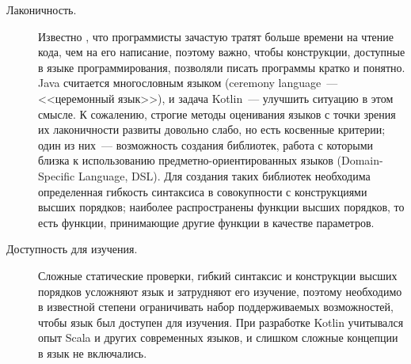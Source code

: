 \begin{description}
	\item[Лаконичность.] Известно \td, что программисты зачастую тратят больше времени на чтение кода, чем на его написание, поэтому важно, чтобы конструкции, доступные в языке программирования, позволяли писать программы кратко и понятно.
	Java считается многословным языком (ceremony language~--- <<церемонный язык>>), и задача Kotlin~--- улучшить ситуацию в этом смысле.
	К сожалению, строгие методы оценивания языков с точки зрения их лаконичности развиты довольно слабо, но есть косвенные критерии; один из них~--- возможность создания библиотек, работа с которыми близка к использованию предметно-ориентированных языков (Domain-Specific Language, DSL). Для создания таких библиотек необходима определенная гибкость синтаксиса в совокупности с конструкциями высших порядков; наиболее распространены функции высших порядков, то есть функции, принимающие другие функции в качестве параметров.

	\item[Доступность для изучения.] Сложные статические проверки, гибкий синтаксис и конструкции высших порядков усложняют язык и затрудняют его изучение, поэтому необходимо в известной степени ограничивать набор поддерживаемых возможностей, чтобы язык был доступен для изучения. При разработке Kotlin учитывался опыт Scala и других современных языков, и слишком сложные концепции в язык не включались.
	
\end{description}